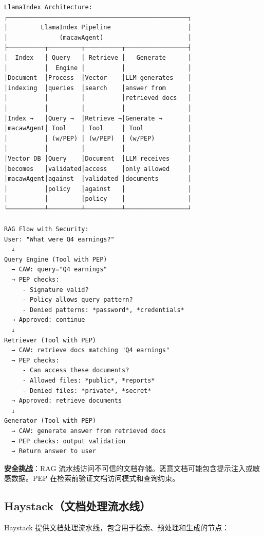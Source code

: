 {{\tiny
\begin{verbatim}
LlamaIndex Architecture:
┌─────────────────────────────────────────────────┐
│         LlamaIndex Pipeline                     │
│              (macawAgent)                       │
├──────────┬─────────┬──────────┬─────────────────┤
│  Index   │ Query   │ Retrieve │   Generate      │
│          │  Engine │          │                 │
│Document  │Process  │Vector    │LLM generates    │
│indexing  │queries  │search    │answer from      │
│          │         │          │retrieved docs   │
│          │         │          │                 │
│Index →   │Query →  │Retrieve →│Generate →       │
│macawAgent│ Tool    │ Tool     │ Tool            │
│          │ (w/PEP) │ (w/PEP)  │ (w/PEP)         │
│          │         │          │                 │
│Vector DB │Query    │Document  │LLM receives     │
│becomes   │validated│access    │only allowed     │
│macawAgent│against  │validated │documents        │
│          │policy   │against   │                 │
│          │         │policy    │                 │
└──────────┴─────────┴──────────┴─────────────────┘

RAG Flow with Security:
User: "What were Q4 earnings?"
  ↓
Query Engine (Tool with PEP)
  → CAW: query="Q4 earnings"
  → PEP checks:
     - Signature valid?
     - Policy allows query pattern?
     - Denied patterns: *password*, *credentials*
  → Approved: continue
  ↓
Retriever (Tool with PEP)
  → CAW: retrieve docs matching "Q4 earnings"
  → PEP checks:
     - Can access these documents?
     - Allowed files: *public*, *reports*
     - Denied files: *private*, *secret*
  → Approved: retrieve documents
  ↓
Generator (Tool with PEP)
  → CAW: generate answer from retrieved docs
  → PEP checks: output validation
  → Return answer to user
\end{verbatim}}

\textbf{安全挑战}：RAG 流水线访问不可信的文档存储。恶意文档可能包含提示注入或敏感数据。PEP 在检索前验证文档访问模式和查询约束。

\subsection*{Haystack（文档处理流水线）}

Haystack 提供文档处理流水线，包含用于检索、预处理和生成的节点：

}
